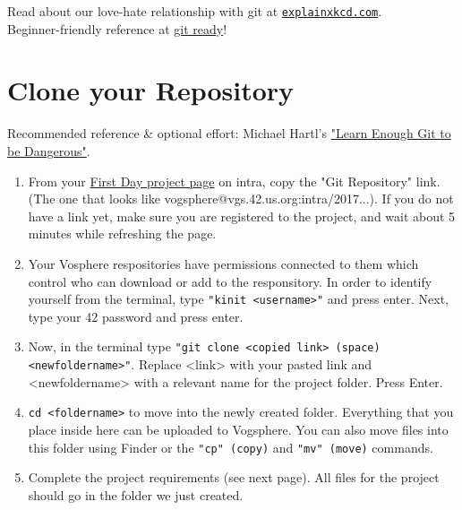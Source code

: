 \documentclass{42-en}
\begin{document}
Read about our love-hate relationship with git at \texttt{\href{https://explainxkcd.com/wiki/index.php/1597:_Git}{explainxkcd.com}}.\\

\noindent Beginner-friendly reference at \href{http://gitready.com/}{git ready}!


\chapter{Clone your Repository}

Recommended reference \& optional effort: Michael Hartl's \href{https://www.learnenough.com/git-tutorial}{"Learn Enough Git to be Dangerous"}.

\begin{enumerate}

\item From your \href{https://projects.intra.42.fr/h2s-first-day/mine}{First Day project page} on intra, copy the "Git Repository" link. (The one that looks like vogsphere@vgs.42.us.org:intra/2017...). If you do not have a link yet, make sure you are registered to the project, and wait about 5 minutes while refreshing the page.

\item Your Vosphere respositories have permissions connected to them which control who can download or add to the responsitory. In order to identify yourself from the terminal, type \texttt{"kinit <username>"} and press enter. Next, type your 42 password and press enter.

\item Now, in the terminal type \texttt{"git clone <copied link> (space) <newfoldername>"}. Replace <link> with your pasted link and <newfoldername> with a relevant name for the project folder. Press Enter.

\item \texttt{cd <foldername>} to move into the newly created folder. Everything that you place inside here can be uploaded to Vogsphere. You can also move files into this folder using Finder or the \texttt{"cp" (copy)} and \texttt{"mv" (move)} commands.

\item Complete the project requirements (see next page). All files for the project should go in the folder we just created.

\end{enumerate}
\end{document}
